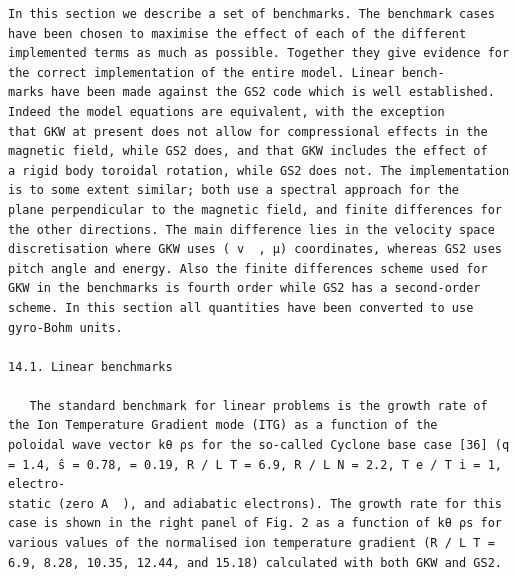\documentclass[a4paper]{article}
\newcommand{\gkwpagefont}{\fontsize{6.0pt}{7.55pt}\selectfont}
\begin{document}
\begin{Verbatim}[fontsize=\gkwpagefont]
   In this section we describe a set of benchmarks. The benchmark cases have been chosen to maximise the effect of each of the different
implemented terms as much as possible. Together they give evidence for the correct implementation of the entire model. Linear bench-
marks have been made against the GS2 code which is well established. Indeed the model equations are equivalent, with the exception
that GKW at present does not allow for compressional effects in the magnetic field, while GS2 does, and that GKW includes the effect of
a rigid body toroidal rotation, while GS2 does not. The implementation is to some extent similar; both use a spectral approach for the
plane perpendicular to the magnetic field, and finite differences for the other directions. The main difference lies in the velocity space
discretisation where GKW uses ( v  , μ) coordinates, whereas GS2 uses pitch angle and energy. Also the finite differences scheme used for
GKW in the benchmarks is fourth order while GS2 has a second-order scheme. In this section all quantities have been converted to use
gyro-Bohm units.

14.1. Linear benchmarks

   The standard benchmark for linear problems is the growth rate of the Ion Temperature Gradient mode (ITG) as a function of the
poloidal wave vector kθ ρs for the so-called Cyclone base case [36] (q = 1.4, ŝ = 0.78, = 0.19, R / L T = 6.9, R / L N = 2.2, T e / T i = 1, electro-
static (zero A  ), and adiabatic electrons). The growth rate for this case is shown in the right panel of Fig. 2 as a function of kθ ρs for
various values of the normalised ion temperature gradient (R / L T = 6.9, 8.28, 10.35, 12.44, and 15.18) calculated with both GKW and GS2.
\end{Verbatim}
\newpage
\end{document}
